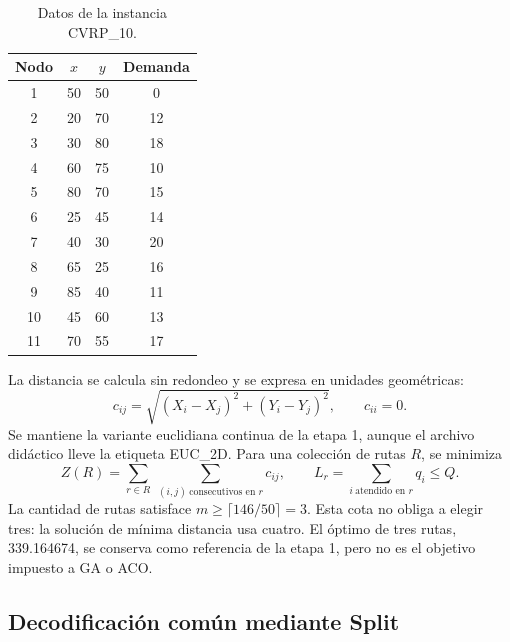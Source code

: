 \documentclass[11pt,a4paper]{article}
\numberwithin{equation}{section}
\begin{document}
\begin{table}[H]\centering\small
\caption{Datos de la instancia CVRP\_10.}\label{tab:datos}
\begin{tabular}{cccc}\toprule
Nodo & \(x\) & \(y\) & Demanda\\\midrule
1 & 50 & 50 & 0\\ 2 & 20 & 70 & 12\\ 3 & 30 & 80 & 18\\ 4 & 60 & 75 & 10\\ 5 & 80 & 70 & 15\\ 6 & 25 & 45 & 14\\
7 & 40 & 30 & 20\\ 8 & 65 & 25 & 16\\ 9 & 85 & 40 & 11\\ 10 & 45 & 60 & 13\\ 11 & 70 & 55 & 17\\\bottomrule
\end{tabular}
\end{table}

La distancia se calcula sin redondeo y se expresa en unidades geométricas:
\begin{equation}\label{eq:dist}
c_{ij}=\sqrt{(X_i-X_j)^2+(Y_i-Y_j)^2},\qquad c_{ii}=0.
\end{equation}
Se mantiene la variante euclidiana continua de la etapa 1, aunque el archivo didáctico lleve la etiqueta EUC\_2D. Para una colección de rutas \(R\), se minimiza
\begin{equation}\label{eq:obj}
Z(R)=\sum_{r\in R}\ \sum_{(i,j)\ \text{consecutivos en } r} c_{ij},\qquad L_r=\sum_{i\ \text{atendido en } r} q_i\le Q .
\end{equation}
La cantidad de rutas satisface \(m\ge\lceil 146/50\rceil=3\). Esta cota no obliga a elegir tres: la solución de mínima distancia usa cuatro. El óptimo de tres rutas, 339.164674, se conserva como referencia de la etapa 1, pero no es el objetivo impuesto a GA o ACO.

\subsection{Decodificación común mediante Split}
\end{document}
